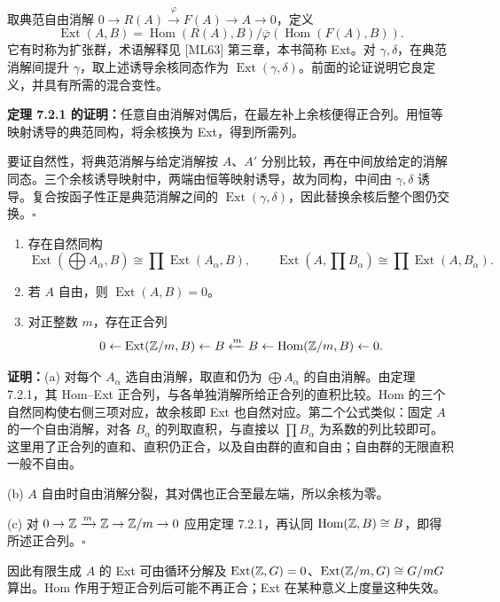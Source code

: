 取典范自由消解 $0\to R(A)\xrightarrow{\varphi}F(A)\to A\to0$，定义
\[
\operatorname{Ext}(A,B)=\operatorname{Hom}(R(A),B)/\overline\varphi(\operatorname{Hom}(F(A),B)).
\]
它有时称为扩张群，术语解释见 [ML63] 第三章，本书简称 Ext。对 $\gamma,\delta$，在典范消解间提升 $\gamma$，取上述诱导余核同态作为 $\operatorname{Ext}(\gamma,\delta)$。前面的论证说明它良定义，并具有所需的混合变性。

\textbf{定理 7.2.1 的证明：}任意自由消解对偶后，在最左补上余核便得正合列。用恒等映射诱导的典范同构，将余核换为 Ext，得到所需列。

要证自然性，将典范消解与给定消解按 $A$、$A'$ 分别比较，再在中间放给定的消解同态。三个余核诱导映射中，两端由恒等映射诱导，故为同构，中间由 $\gamma,\delta$ 诱导。复合按函子性正是典范消解之间的 $\operatorname{Ext}(\gamma,\delta)$，因此替换余核后整个图仍交换。\hfill$\square$

\begin{enumerate}[label=(\alph*)]
\item 存在自然同构
\[
\operatorname{Ext}(\bigoplus A_\alpha,B)\cong\prod\operatorname{Ext}(A_\alpha,B),\qquad
\operatorname{Ext}(A,\prod B_\alpha)\cong\prod\operatorname{Ext}(A,B_\alpha).
\]
\item 若 $A$ 自由，则 $\operatorname{Ext}(A,B)=0$。
\item 对正整数 $m$，存在正合列
\[
0\leftarrow\operatorname{Ext}(\mathbb{Z}/m,B)\leftarrow B\xleftarrow{m}B\leftarrow\operatorname{Hom}(\mathbb{Z}/m,B)\leftarrow0.
\]
\end{enumerate}

\textbf{证明：}(a) 对每个 $A_\alpha$ 选自由消解，取直和仍为 $\bigoplus A_\alpha$ 的自由消解。由定理 7.2.1，其 Hom--Ext 正合列，与各单独消解所给正合列的直积比较。Hom 的三个自然同构使右侧三项对应，故余核即 Ext 也自然对应。第二个公式类似：固定 $A$ 的一个自由消解，对各 $B_\alpha$ 的列取直积，与直接以 $\prod B_\alpha$ 为系数的列比较即可。这里用了正合列的直和、直积仍正合，以及自由群的直和自由；自由群的无限直积一般不自由。

(b) $A$ 自由时自由消解分裂，其对偶也正合至最左端，所以余核为零。

(c) 对 $0\to\mathbb{Z}\xrightarrow{m}\mathbb{Z}\to\mathbb{Z}/m\to0$ 应用定理 7.2.1，再认同 $\operatorname{Hom}(\mathbb{Z},B)\cong B$，即得所述正合列。\hfill$\square$

因此有限生成 $A$ 的 Ext 可由循环分解及 $\operatorname{Ext}(\mathbb{Z},G)=0$、$\operatorname{Ext}(\mathbb{Z}/m,G)\cong G/mG$ 算出。Hom 作用于短正合列后可能不再正合；Ext 在某种意义上度量这种失效。

